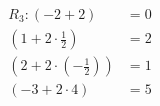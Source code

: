 \documentclass[preview]{standalone}
\begin{document}
\begin{align*}
R_3: (-2 + 2) & = 0 \\ (1 + 2\cdot\frac{1}{2}) & = 2 \\ (2 + 2\cdot(-\frac{1}{2})) & = 1 \\ (-3 + 2\cdot4) & = 5
\end{align*}
\end{document}
